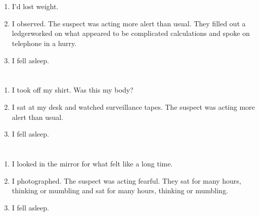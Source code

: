 \documentclass{article}
\begin{document}
    \newpage
    
    \section{}
    
    \begin{enumerate}
    
    \item I'd lost weight.\\
    
    \item I observed. The suspect was acting more alert than usual. They filled out a ledgerworked on what appeared to be complicated calculations and spoke on telephone in a hurry.\\
    
    \item I fell asleep.\\
    
    \end{enumerate}
     
    \newpage
    
    \section{}
    
    \begin{enumerate}
    
    \item I took off my shirt. Was this my body?\\
    
    \item I sat at my desk and watched surveillance tapes. The suspect was acting more alert than usual.\\
    
    \item I fell asleep.\\
    
    \end{enumerate}
     
    \newpage
    
    \section{}
    
    \begin{enumerate}
    
    \item I looked in the mirror for what felt like a long time.\\
    
    \item I photographed. The suspect was acting fearful. They sat for many hours, thinking or mumbling and sat for many hours, thinking or mumbling.\\
    
    \item I fell asleep.\\
    
    \end{enumerate}
     
\end{document}
